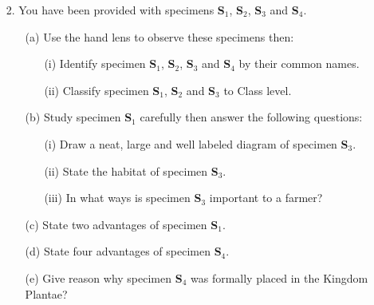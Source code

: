 \begin{enumerate}
\item[2.] You have been provided with specimens \textbf{S$_1$}, \textbf{S$_2$}, \textbf{S$_3$} and \textbf{S$_4$}.
\begin{enumerate}
\item[(a)] Use the hand lens to observe these specimens then:
\begin{enumerate} 
\item[(i)] Identify specimen \textbf{S$_1$}, \textbf{S$_2$}, \textbf{S$_3$} and \textbf{S$_4$} by their common names.
\item[(ii)] Classify specimen \textbf{S$_1$}, \textbf{S$_2$} and \textbf{S$_3$} to Class level.
\end{enumerate}
\item[(b)] Study specimen \textbf{S$_1$} carefully then answer the following questions:
\begin{enumerate}
\item[(i)] Draw a neat, large and well labeled diagram of specimen \textbf{S$_3$}.
\item[(ii)] State the habitat of specimen \textbf{S$_3$}.
\item[(iii)] In what ways is specimen \textbf{S$_3$} important to a farmer?
\end{enumerate}
\item[(c)] State two advantages of specimen \textbf{S$_1$}.
\item[(d)] State four advantages of specimen \textbf{S$_4$}.
\item[(e)] Give reason why specimen \textbf{S$_4$} was formally placed in the Kingdom Plantae?
\end{enumerate}
\end{enumerate}